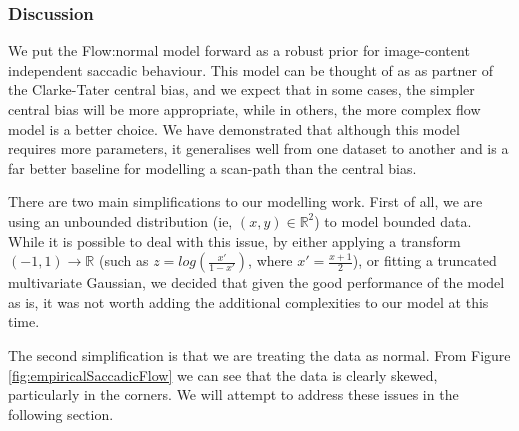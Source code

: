 
\subsubsection{Discussion}

We put the Flow:normal model forward as a robust prior for image-content independent saccadic behaviour. This model can be thought of as as partner of the Clarke-Tater central bias, and we expect that in some cases, the simpler central bias will be more appropriate, while in others, the more complex flow model is a better choice. We have demonstrated that although this model requires more parameters, it generalises well from one dataset to another and is a far better baseline for modelling a scan-path than the central bias.

There are two main simplifications to our modelling work. First of all, we are using an unbounded distribution (ie, $(x,y)\in \mathbb{R}^2$) to model bounded data. While it is possible to deal with this issue, by either applying a transform $(-1,1)\rightarrow \mathbb{R}$ (such as $z=log(\frac{x'}{1-x'})$, where $x'=\frac{x+1}{2}$), or fitting a truncated multivariate Gaussian, we decided that given the good performance of the model as is, it was not worth adding the additional complexities to our model at this time. 

The second simplification is that we are treating the data as normal. From Figure \ref{fig:empiricalSaccadicFlow} we can see that the data is clearly skewed, particularly in the corners. We will attempt to address these issues in the following section.
